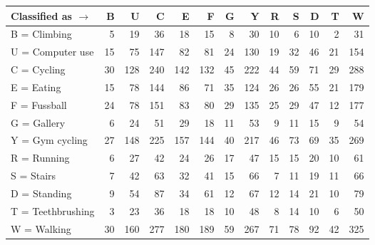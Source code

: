 \begin{tabular}{lrrrrrrrrrrrr}
\toprule
Classified as $\rightarrow$ &   B &    U &    C &    E &    F &   G &    Y &   R &   S &   D &   T &    W \\
\midrule
B = Climbing      &   5 &   19 &   36 &   18 &   15 &   8 &   30 &  10 &   6 &  10 &   2 &   31 \\
U = Computer use  &  15 &   75 &  147 &   82 &   81 &  24 &  130 &  19 &  32 &  46 &  21 &  154 \\
C = Cycling       &  30 &  128 &  240 &  142 &  132 &  45 &  222 &  44 &  59 &  71 &  29 &  288 \\
E = Eating        &  15 &   78 &  144 &   86 &   71 &  35 &  124 &  26 &  26 &  55 &  21 &  179 \\
F = Fussball      &  24 &   78 &  151 &   83 &   80 &  29 &  135 &  25 &  29 &  47 &  12 &  177 \\
G = Gallery       &   6 &   24 &   51 &   29 &   18 &  11 &   53 &   9 &  11 &  15 &   9 &   54 \\
Y = Gym cycling   &  27 &  148 &  225 &  157 &  144 &  40 &  217 &  46 &  73 &  69 &  35 &  269 \\
R = Running       &   6 &   27 &   42 &   24 &   26 &  17 &   47 &  15 &  15 &  20 &  10 &   61 \\
S = Stairs        &   7 &   42 &   63 &   32 &   41 &  15 &   66 &   7 &  11 &  19 &  11 &   66 \\
D = Standing      &   9 &   54 &   87 &   34 &   61 &  12 &   67 &  12 &  14 &  21 &  10 &   79 \\
T = Teethbrushing &   3 &   23 &   36 &   18 &   18 &  10 &   48 &   8 &  14 &  10 &   6 &   50 \\
W = Walking       &  30 &  160 &  277 &  180 &  189 &  59 &  267 &  71 &  78 &  92 &  42 &  325 \\
\bottomrule
\end{tabular}
